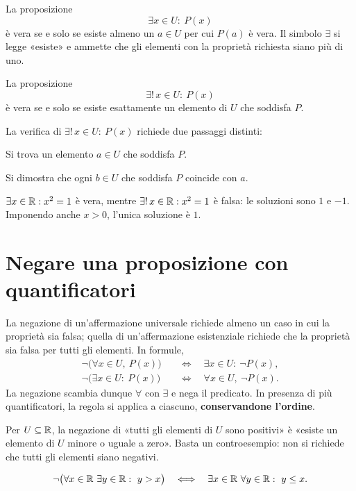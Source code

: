 \begin{definizione}
La proposizione
\[
  \exists x\in U:\ P(x)
\]
è vera se e solo se esiste almeno un $a\in U$ per cui $P(a)$ è vera. Il simbolo $\exists$ si legge «esiste» e ammette che gli elementi con la proprietà richiesta siano più di uno.
\end{definizione}

\begin{definizione}
La proposizione
\[
  \exists!\,x\in U:\ P(x)
\]
è vera se e solo se esiste esattamente un elemento di $U$ che soddisfa $P$.
\end{definizione}

La verifica di $\exists!\,x\in U:\ P(x)$ richiede due passaggi distinti:
\begin{description}[itemsep=.3em,topsep=.4em]
  \item[Esistenza.] Si trova un elemento $a\in U$ che soddisfa $P$.
  \item[Unicità.] Si dimostra che ogni $b\in U$ che soddisfa $P$ coincide con $a$.
\end{description}

\begin{esempio}
$\exists x\in\mathbb{R}:x^2=1$ è vera, mentre $\exists!\,x\in\mathbb{R}:x^2=1$ è falsa: le soluzioni sono $1$ e $-1$. Imponendo anche $x>0$, l'unica soluzione è $1$.
\end{esempio}

\section{Negare una proposizione con quantificatori}

La negazione di un'affermazione universale richiede almeno un caso in cui la proprietà sia falsa; quella di un'affermazione esistenziale richiede che la proprietà sia falsa per tutti gli elementi. In formule,
\begin{align*}
  \neg\bigl(\forall x\in U,\ P(x)\bigr)
    &\quad\Longleftrightarrow\quad \exists x\in U:\ \neg P(x),\\
  \neg\bigl(\exists x\in U:\ P(x)\bigr)
    &\quad\Longleftrightarrow\quad \forall x\in U,\ \neg P(x).
\end{align*}
La negazione scambia dunque $\forall$ con $\exists$ e nega il predicato. In presenza di più quantificatori, la regola si applica a ciascuno, \textbf{conservandone l'ordine}.

\begin{esempio}
Per $U\subseteq\mathbb{R}$, la negazione di «tutti gli elementi di $U$ sono positivi» è «esiste un elemento di $U$ minore o uguale a zero». Basta un controesempio: non si richiede che tutti gli elementi siano negativi.
\end{esempio}

\begin{esempio}
\[
  \neg\bigl(\forall x\in\mathbb{R}\ \exists y\in\mathbb{R}:\ y>x\bigr)
  \quad\Longleftrightarrow\quad
  \exists x\in\mathbb{R}\ \forall y\in\mathbb{R}:\ y\le x.
\]
\end{esempio}
